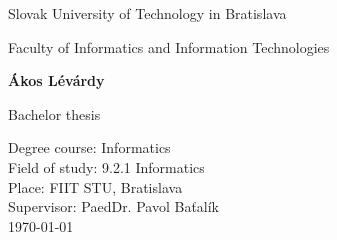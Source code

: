 \documentclass[\myFontSize,oneside,english,hidelinks,a4paper]{article}
\begin{document}
 


\begin{center}
\thispagestyle{empty}
{\Large Slovak University of Technology in Bratislava}
\par\end{center}{\Large \par}

\begin{center}
{\Large Faculty of Informatics and Information Technologies} 
\par\end{center}{\Large \par}

\smallskip{}

\vfill{}

\begin{center}
\textbf{\Large Ákos Lévárdy}
\par\end{center}{\Large \par}

\medskip{}

\begin{center}
\textbf{\Large \thesisTitle}
\par\end{center}{\Large \par}

\medskip{}

\begin{center}
{\Large Bachelor thesis}
\par\end{center}{\Large \par}

\vfill{}

\Large{
Degree course: Informatics\\ 
Field of study: 9.2.1 Informatics\\ 
Place: FIIT STU, Bratislava\\ 
Supervisor: PaedDr. Pavol Baťalík\\
\today}

%
\end{document}
